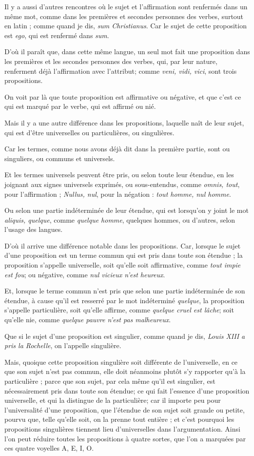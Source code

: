 Il y a aussi d'autres rencontres où le sujet et l'affirmation sont renfermés dans un même mot, comme dans les premières et secondes personnes des verbes, surtout en latin ; comme quand je dis, \emph{sum Christianus}. Car le sujet de cette proposition est \emph{ego}, qui est renfermé dans \emph{sum}.

D'où il paraît que, dans cette même langue, un seul mot fait une proposition dans les premières et les secondes personnes des verbes, qui, par leur nature, renferment déjà l'affirmation avec l'attribut; comme \emph{veni, vidi, vici}, sont trois propositions.

On voit par là que toute proposition est affirmative ou négative, et que c'est ce qui est marqué par le verbe, qui est affirmé ou nié.

Mais il y a une autre différence dans les propositions, laquelle naît de leur sujet, qui est d'être universelles ou particulières, ou singulières.

Car les termes, comme nous avons déjà dit dans la première partie, sont ou singuliers, ou communs et universels.

Et les termes universels peuvent être pris, ou selon toute leur étendue, en les joignant aux signes universels exprimés, ou sous-entendus, comme \emph{omnis, tout}, pour l'affirmation ; \emph{Nullus, nul}, pour la négation : \emph{tout homme, nul homme}.

Ou selon une partie indéterminée de leur étendue, qui est lorsqu'on y joint le mot \emph{aliquis, quelque}, comme \emph{quelque homme}, quelques hommes, ou d'autres, selon l'usage des langues.

D'où il arrive une différence notable dans les propositions. Car, lorsque le sujet d'une proposition est un terme commun qui est pris dans toute son étendue ; la proposition s'appelle universelle, soit qu'elle soit affirmative, comme \emph{tout impie est fou}; ou négative, comme \emph{nul vicieux n'est heureux}.

Et, lorsque le terme commun n'est pris que selon une partie indéterminée de son étendue, à cause qu'il est resserré par le mot indéterminé \emph{quelque}, la proposition s'appelle particulière, soit qu'elle affirme, comme \emph{quelque cruel est lâche}; soit qu'elle nie, comme \emph{quelque pauvre n'est pas malheureux}.

Que si le sujet d'une proposition est singulier, comme quand je dis, \emph{Louis XIII a pris la Rochelle}, on l'appelle singulière.

Mais, quoique cette proposition singulière soit différente de l'universelle, en ce que son sujet n'est pas commun, elle doit néanmoins plutôt s'y rapporter qu'à la particulière ; parce que son sujet, par cela même qu'il est singulier, est nécessairement pris dans toute son étendue; ce qui fait l'essence d'une proposition universelle, et qui la distingue de la particulière; car il importe peu pour l'universalité d'une proposition, que l'étendue de son sujet soit grande ou petite, pourvu que, telle qu'elle soit, on la prenne tout entière ; et c'est pourquoi les propositions singulières tiennent lieu d'universelles dans l'argumentation. Ainsi l'on peut réduire toutes les propositions à quatre sortes, que l'on a marquées par ces quatre voyelles A, E, I, O.


